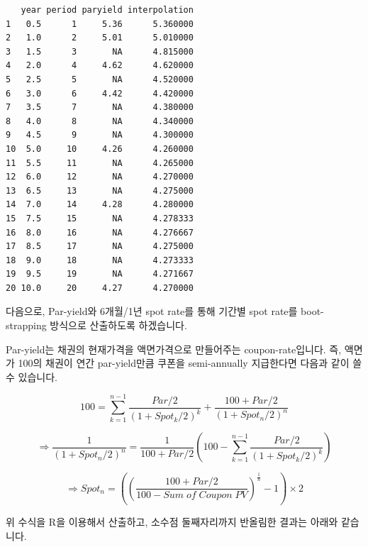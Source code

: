 \documentclass[
  letterpaper,
  DIV=11,
  numbers=noendperiod]{scrreprt}
\begin{document}
\begin{verbatim}
   year period paryield interpolation
1   0.5      1     5.36      5.360000
2   1.0      2     5.01      5.010000
3   1.5      3       NA      4.815000
4   2.0      4     4.62      4.620000
5   2.5      5       NA      4.520000
6   3.0      6     4.42      4.420000
7   3.5      7       NA      4.380000
8   4.0      8       NA      4.340000
9   4.5      9       NA      4.300000
10  5.0     10     4.26      4.260000
11  5.5     11       NA      4.265000
12  6.0     12       NA      4.270000
13  6.5     13       NA      4.275000
14  7.0     14     4.28      4.280000
15  7.5     15       NA      4.278333
16  8.0     16       NA      4.276667
17  8.5     17       NA      4.275000
18  9.0     18       NA      4.273333
19  9.5     19       NA      4.271667
20 10.0     20     4.27      4.270000
\end{verbatim}

다음으로, Par-yield와 6개월/1년 spot rate를 통해 기간별 spot rate를
boot-strapping 방식으로 산출하도록 하겠습니다.

Par-yield는 채권의 현재가격을 액면가격으로 만들어주는 coupon-rate입니다.
즉, 액면가 100의 채권이 연간 par-yield만큼 쿠폰을 semi-annually
지급한다면 다음과 같이 쓸 수 있습니다.

\[100=\sum_{k=1}^{n-1}\frac{Par/2}{(1+Spot_k/2)^k}+\frac{100+Par/2}{(1+Spot_n/2)^n}\]

\[\Rightarrow \frac{1}{(1+Spot_n/2)^n}=\frac{1}{100+Par/2}(100-\sum_{k=1}^{n-1}\frac{Par/2}{(1+Spot_k/2)^k})\]

\[\Rightarrow Spot_n=((\frac{100+Par/2}{100-Sum\;of\;Coupon\;PV})^{\frac{1}{n}}-1)\times 2\]

위 수식을 R을 이용해서 산출하고, 소수점 둘째자리까지 반올림한 결과는
아래와 같습니다.
\end{document}
